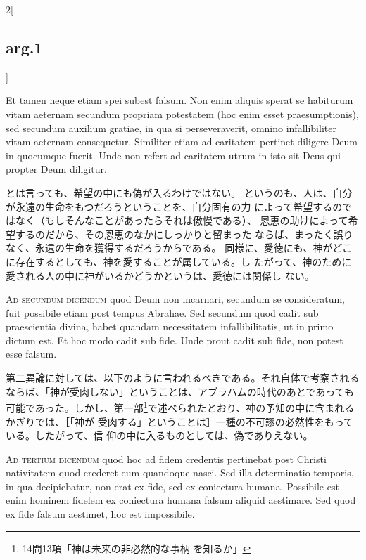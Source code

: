 \documentclass[paper=a4paper,fontsize=10pt,jafontsize=9pt,titlepage]{jlreq}
\begin{document}
\begin{paracol}{2}[\subsection{arg.1}]
\switchcolumn*

Et tamen neque etiam spei subest falsum. Non enim
aliquis sperat se habiturum vitam aeternam secundum propriam potestatem
(hoc enim esset praesumptionis), sed secundum auxilium gratiae, in qua
si perseveraverit, omnino infallibiliter vitam aeternam
consequetur. Similiter etiam ad caritatem pertinet diligere Deum in
quocumque fuerit. Unde non refert ad caritatem utrum in isto sit Deus
qui propter Deum diligitur.

\switchcolumn

とは言っても、希望の中にも偽が入るわけではない。
というのも、人は、自分が永遠の生命をもつだろうということを、自分固有の力
 によって希望するのではなく（もしそんなことがあったらそれは傲慢である）、
 恩恵の助けによって希望するのだから、その恩恵のなかにしっかりと留まった
 ならば、まったく誤りなく、永遠の生命を獲得するだろうからである。
同様に、愛徳にも、神がどこに存在するとしても、神を愛することが属している。し
 たがって、神のために愛される人の中に神がいるかどうかというは、愛徳には関係し
 ない。

\switchcolumn*[\subsection{ad.2}]

{\scshape Ad secundum dicendum} quod Deum non
incarnari, secundum se consideratum, fuit possibile etiam post tempus
Abrahae. Sed secundum quod cadit sub praescientia divina, habet quandam
necessitatem infallibilitatis, ut in primo dictum est. Et hoc modo cadit
sub fide. Unde prout cadit sub fide, non potest esse falsum.

\switchcolumn

第二異論に対しては、以下のように言われるべきである。それ自体で考察される
ならば、「神が受肉しない」ということは、アブラハムの時代のあとであっても
可能であった。しかし、第一部\footnote{14問13項「神は未来の非必然的な事柄
を知るか」}で述べられたとおり、神の予知の中に含まれるかぎりでは、［「神が
受肉する」ということは］一種の不可謬の必然性をもっている。したがって、信
仰の中に入るものとしては、偽でありえない。

\switchcolumn*[\subsection{ad.3}]

{\scshape Ad tertium dicendum} quod hoc ad fidem
credentis pertinebat post Christi nativitatem quod crederet eum
quandoque nasci. Sed illa determinatio temporis, in qua decipiebatur,
non erat ex fide, sed ex coniectura humana. Possibile est enim hominem
fidelem ex coniectura humana falsum aliquid aestimare. Sed quod ex fide
falsum aestimet, hoc est impossibile.


\end{paracol}
\end{document}
